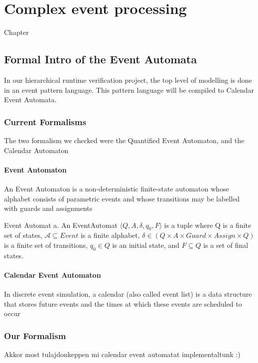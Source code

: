 \chapter{Complex event processing}
\label{chap:cep}

Chapter
\section{Formal Intro of the Event Automata}
	In our hierarchical runtime verification project, the top level of modelling is done in an event pattern language.
	This pattern language will be compiled to Calendar Event Automata.
	\subsection{Current Formalisms}
		The two formalism we checked were the Quantified Event Automaton, and the Calendar Automaton
		\subsubsection{Event Automaton}
			An Event Automaton is a non-deterministic finite-state automaton whose alphabet consists
			of parametric events and whose transitions may be labelled with guards and assignments
			
			\begin{dfn}
			Event Automat a. An EventAutomat $\langle Q,A,\delta, q_0, F \rangle$
			is a tuple where Q is a finite set of states, $\mathcal{A} \subseteq Event$
			is a finite alphabet, $\delta \in (Q \times A \times Guard \times Assign \times Q)$
			is a finite set of transitions, $q_0 \in Q$ is an initial state, and $F \subseteq Q$ is a set of final states.
			\end{dfn}
			
		\subsubsection{Calendar Event Automaton}
			In discrete event simulation, a calendar (also called event list) is a data structure that
			stores future events and the times at which these events are scheduled to occur
			
	\subsection{Our Formalism}
		Akkor most tulajdonkeppen mi calendar event automatat implementaltunk :) 
